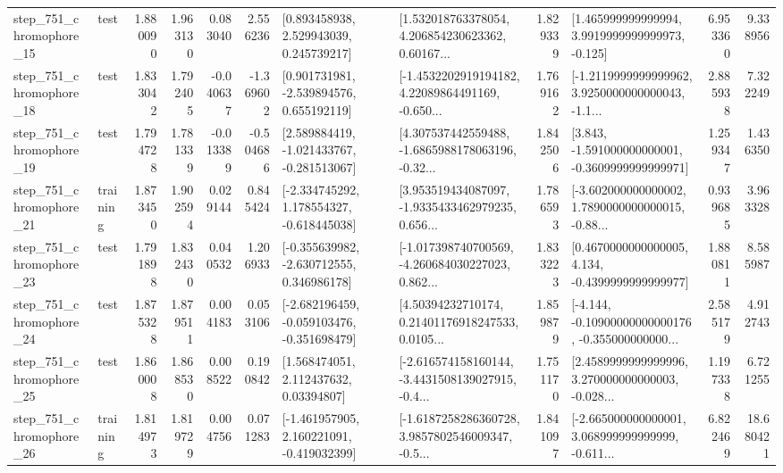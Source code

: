 \begin{tabular}{llrrrrllrlrr}
  step\_751\_chromophore\_15 &      test &      1.880090 &    1.963130 &      0.083040 &  2.556236 &     [0.893458938, 2.529943039, 0.245739217] &  [1.532018763378054, 4.206854230623362, 0.60167... &       1.829339 &    [1.465999999999994, 3.9919999999999973, -0.125] &            6.953360 &          9.338956 \\
  step\_751\_chromophore\_18 &      test &      1.833042 &    1.792405 &     -0.040637 & -1.369602 &    [0.901731981, -2.539894576, 0.655192119] &  [-1.4532202919194182, 4.22089864491169, -0.650... &       1.769162 &  [-1.2119999999999962, 3.9250000000000043, -1.1... &            2.885938 &          7.322249 \\
  step\_751\_chromophore\_19 &      test &      1.794728 &    1.781339 &     -0.013389 & -0.504686 &   [2.589884419, -1.021433767, -0.281513067] &  [4.307537442559488, -1.6865988178063196, -0.32... &       1.842506 &   [3.843, -1.591000000000001, -0.3609999999999971] &            1.259347 &          1.436350 \\
  step\_751\_chromophore\_21 &  training &      1.873450 &    1.902594 &      0.029144 &  0.845424 &   [-2.334745292, 1.178554327, -0.618445038] &  [3.953519434087097, -1.9335433462979235, 0.656... &       1.786593 &  [-3.602000000000002, 1.7890000000000015, -0.88... &            0.939685 &          3.963328 \\
  step\_751\_chromophore\_23 &      test &      1.791898 &    1.832430 &      0.040532 &  1.206933 &   [-0.355639982, -2.630712555, 0.346986178] &  [-1.017398740700569, -4.260684030227023, 0.862... &       1.833223 &   [0.4670000000000005, 4.134, -0.4399999999999977] &            1.880811 &          8.585987 \\
  step\_751\_chromophore\_24 &      test &      1.875328 &    1.879511 &      0.004183 &  0.053106 &  [-2.682196459, -0.059103476, -0.351698479] &  [4.50394232710174, 0.21401176918247533, 0.0105... &       1.859879 &  [-4.144, -0.10900000000000176, -0.355000000000... &            2.585179 &          4.912743 \\
  step\_751\_chromophore\_25 &      test &      1.860008 &    1.868530 &      0.008522 &  0.190842 &      [1.568474051, 2.112437632, 0.03394807] &  [-2.616574158160144, -3.4431508139027915, -0.4... &       1.751170 &  [2.4589999999999996, 3.270000000000003, -0.028... &            1.197338 &          6.721255 \\
  step\_751\_chromophore\_26 &  training &      1.814973 &    1.819729 &      0.004756 &  0.071283 &   [-1.461957905, 2.160221091, -0.419032399] &  [-1.6187258286360728, 3.9857802546009347, -0.5... &       1.841097 &  [-2.665000000000001, 3.068999999999999, -0.611... &            6.822469 &         18.680421 \\

\end{tabular}
